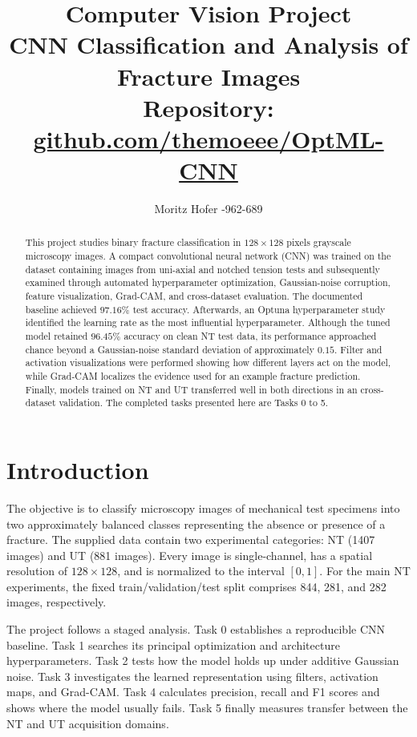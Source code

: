 \documentclass[11pt]{article}
\title{Computer Vision Project\\
\large CNN Classification and Analysis of Fracture Images\\[0.4em]
\normalsize Repository: \href{https://github.com/themoeee/OptML-CNN}{github.com/themoeee/OptML-CNN}}
\author{Moritz Hofer \quad 25-962-689}
\date{}
\begin{document}
\maketitle

\begin{abstract}
This project studies binary fracture classification in $128\times128$ pixels grayscale microscopy images. A compact convolutional neural network (CNN) was trained on the dataset containing images from uni-axial and notched tension tests and subsequently examined through automated hyperparameter optimization, Gaussian-noise corruption, feature visualization, Grad-CAM, and cross-dataset evaluation. The documented baseline achieved $97.16\%$ test accuracy. Afterwards, an Optuna hyperparameter study identified the learning rate as the most influential hyperparameter. Although the tuned model retained $96.45\%$ accuracy on clean NT test data, its performance approached chance beyond a Gaussian-noise standard deviation of approximately $0.15$. Filter and activation visualizations were performed showing how different layers act on the model, while Grad-CAM localizes the evidence used for an example fracture prediction. Finally, models trained on NT and UT transferred well in both directions in an cross-dataset validation. The completed tasks presented here are Tasks 0 to 5.
\end{abstract}

\section{Introduction}

The objective is to classify microscopy images of mechanical test specimens into two approximately balanced classes representing the absence or presence of a fracture. The supplied data contain two experimental categories:  NT (1407 images) and UT (881 images). Every image is single-channel, has a spatial resolution of $128\times128$, and is normalized to the interval $[0,1]$. For the main NT experiments, the fixed train/validation/test split comprises 844, 281, and 282 images, respectively.

The project follows a staged analysis. Task 0 establishes a reproducible CNN baseline. Task 1 searches its principal optimization and architecture hyperparameters. Task 2 tests how the model holds up under additive Gaussian noise. Task 3 investigates the learned representation using filters, activation maps, and Grad-CAM. Task 4 calculates precision, recall and F1 scores and shows where the model usually fails. Task 5 finally measures transfer between the NT and UT acquisition domains. 
\end{document}
